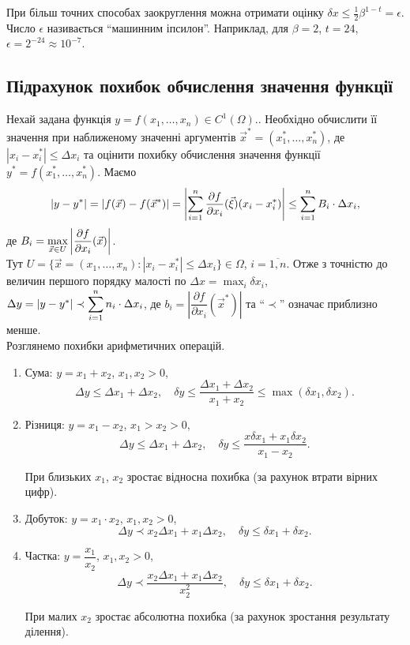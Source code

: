 При більш точних способах заокруглення можна отримати оцінку $\delta x \le \frac12 \beta^{1-t} = \epsilon$. Число $\epsilon$ називається ``машинним іпсилон''. Наприклад, для $\beta = 2$, $t = 24$, $\epsilon = 2^{-24} \approx 10^{-7}$.

\subsection{Підрахунок похибок обчислення значення функції}

Нехай задана функція $y = f(x_1, \ldots, x_n) \in C^1(\Omega)$.. Необхідно обчислити її значення при наближеному значенні аргументів $\vec x^* = (x_1^*, \ldots, x_n^*)$, де $|x_i - x_i^*| \le \Delta x_i$ та оцінити похибку обчислення значення функції $y^* = f(x_1^*, \ldots, x_n^*)$. Маємо \[ |y-y^*| = |f(\vec x) - f(\vec x^*)| = \left| \displaystyle\sum\limits_{i=1}^n \dfrac{\partial f}{\partial x_i} (\vec \xi) (x_i - x_i^*) \right| \le \displaystyle\sum\limits_{i=1}^n B_i \cdot \Delta x_i, \] 
де $B_i = \displaystyle\max\limits_{\vec x \in U} \left| \dfrac{\partial f}{\partial x_i}(\vec x) \right|$. \\

Тут $U = \{ \vec x = (x_1, \ldots, x_n): |x_i - x_i^*| \le \Delta x_i\} \in \Omega$, $i=\overline{1,n}$. Отже з точністю до величин першого порядку малості по $\Delta x = \max_i \delta x_i$, $\Delta y = |y - y^*| \prec \displaystyle\sum\limits_{i=1}^n n_i \cdot \Delta x_i$, де $b_i = \left| \dfrac{\partial f}{\partial x_i}(\vec x^*) \right|$ та ``$\prec$'' означає приблизно менше. \\

Розглянемо похибки арифметичних операцій.
\begin{enumerate}
	\item Сума: $y = x_1 + x_2$, $x_1, x_2 > 0$, 
	\[ \Delta y \le \Delta x_1 + \Delta x_2, \quad \delta y \le \dfrac{\Delta x_1 + \Delta x_2}{x_1 + x_2} \le \max(\delta x_1, \delta x_2). \] 
	
	\item Різниця: $y = x_1 - x_2$, $x_1 > x_2 > 0$,
	\[ \Delta y \le \Delta x_1 + \Delta x_2, \quad \delta y \le \dfrac{x \delta x_1 + x_1 \delta x_2}{x_1 - x_2}. \]
	
	При близьких $x_1$, $x_2$ зростає відносна похибка (за рахунок втрати вірних цифр).

	\item Добуток: $y = x_1 \cdot x_2$, $x_1, x_2 > 0$,
	\[ \Delta y \prec x_2 \Delta x_1 + x_1 \Delta x_2, \quad \delta y \le \delta x_1 + \delta x_2. \]

	\item Частка: $y = \dfrac{x_1}{x_2}$, $x_1, x_2 > 0$,
	\[ \Delta y \prec \dfrac{x_2 \Delta x_1 + x_1 \Delta x_2}{x_2^2}, \quad \delta y \le \delta x_1 + \delta x_2. \]

	При малих $x_2$ зростає абсолютна похибка (за рахунок зростання результату ділення). 
\end{enumerate}

